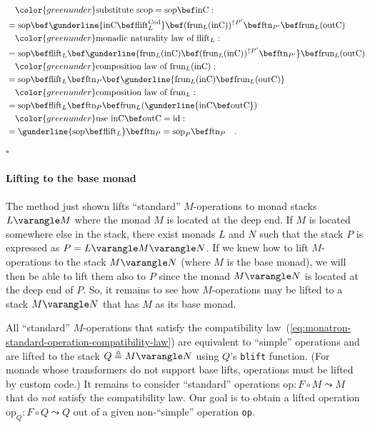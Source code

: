 \begin{align*}
 & \quad{\color{greenunder}\text{substitute }\text{scop}=\text{sop}\bef\text{inC}:}\quad\\
 & =\text{sop}\bef\gunderline{\text{inC}\bef\text{flift}_{L}^{\text{Cod}}}\bef(\text{frun}_{L}(\text{inC}))^{\uparrow P^{\prime}}\bef\text{ftn}_{P^{\prime}}\bef\text{frun}_{L}(\text{outC})\\
 & \quad{\color{greenunder}\text{monadic naturality law of }\text{flift}_{L}:}\quad\\
 & =\text{sop}\bef\text{flift}_{L}\bef\gunderline{\text{frun}_{L}(\text{inC})\bef(\text{frun}_{L}(\text{inC}))^{\uparrow P^{\prime}}\bef\text{ftn}_{P^{\prime}}}\bef\text{frun}_{L}(\text{outC})\\
 & \quad{\color{greenunder}\text{composition law of }\text{frun}_{L}(\text{inC}):}\quad\\
 & =\text{sop}\bef\text{flift}_{L}\bef\text{ftn}_{P}\bef\gunderline{\text{frun}_{L}(\text{inC})\bef\text{frun}_{L}(\text{outC})}\\
 & \quad{\color{greenunder}\text{composition law of }\text{frun}_{L}:}\quad\\
 & =\text{sop}\bef\text{flift}_{L}\bef\text{ftn}_{P}\bef\text{frun}_{L}(\gunderline{\text{inC}\bef\text{outC}})\\
 & \quad{\color{greenunder}\text{use }\text{inC}\bef\text{outC}=\text{id}:}\quad\\
 & =\gunderline{\text{sop}\bef\text{flift}_{L}}\bef\text{ftn}_{P}=\text{sop}_{P}\bef\text{ftn}_{P}\quad.
\end{align*}
$\square$

\paragraph{Lifting to the base monad}

The method just shown lifts \textsf{``}standard\textsf{''} $M$-operations to monad
stacks $L\varangle M$ where the monad $M$ is located at the deep
end. If $M$ is located somewhere else in the stack, there exist monads
$L$ and $N$ such that the stack $P$ is expressed as $P=L\varangle M\varangle N$.
If we knew how to lift $M$-operations to the stack $M\varangle N$
(where $M$ is the base monad), we will then be able to lift them
also to $P$ since the monad $M\varangle N$ is located at the deep
end of $P$. So, it remains to see how $M$-operations may be lifted
to a stack $M\varangle N$ that has $M$ as its base monad.

All \textsf{``}standard\textsf{''} $M$-operations that satisfy the compatibility
law~(\ref{eq:monatron-standard-operation-compatibility-law}) are
equivalent to \textsf{``}simple\textsf{''} operations and are lifted to the stack
$Q\triangleq M\varangle N$ using $Q$\textsf{'}s \lstinline!blift! function.
(For monads whose transformers do not support base lifts, operations
must be lifted by custom code.) It remains to consider \textsf{``}standard\textsf{''}
operations $\text{op}:F\circ M\leadsto M$ that do \emph{not} satisfy
the compatibility law. Our goal is to obtain a lifted operation $\text{op}_{Q}:F\circ Q\leadsto Q$
out of a given non-\textsf{``}simple\textsf{''} operation \lstinline!op!.

